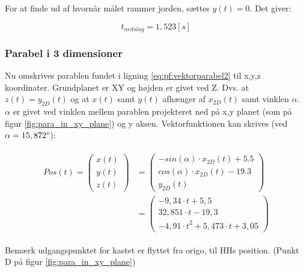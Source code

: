For at finde ud af hvornår målet rammer jorden, sættes \(y(t) = 0\). Det giver:

\begin{equation}
t_{nedslag} = 1,523 [s]
\label{eq:pf:nedslagstid}
\end{equation}

\subsubsection{Parabel i 3 dimensioner}
\label{subsubsec:para}
Nu omskrives parablen fundet i ligning \ref{eq:pf:vektorparabel2} til x,y,z koordinater. 
Grundplanet er XY og højden er givet ved Z. Dvs. at \(z(t) = y_{2D}(t)\) og at \(x(t)\) samt \(y(t)\) afhænger af \(x_{2D}(t)\) samt vinklen \(\alpha\). 
\(\alpha\) er givet ved vinklen mellem parablen projekteret ned på x,y planet (som på figur \ref{fig:para_in_xy_plane}) og y aksen. 
Vektorfunktionen kan skrives (ved \(\alpha = 15,872 \degree\)): 

\begin{align}
\begin{split}
Pos\left( t \right) = 
\left( \begin{matrix} x\left( t \right)  \\
 y\left( t \right)  \\ 
 z\left( t \right)  \end{matrix} \right) &=
 \left( \begin{matrix} - sin\left( \alpha  \right) \cdot { x }_{ 2D }\left( t \right) + 5.5 \\
 cos\left( \alpha  \right) \cdot { x }_{ 2D }\left( t \right) - 19.3  \\
  { y }_{ 2D }\left( t \right)  \end{matrix} \right)
\\
&= \left( \begin{matrix} - 9,34\cdot t+5,5 \\
  32,851\cdot t-19,3 \\ 
 -{ 4,91\cdot t }^{ 2 }+5,473\cdot t+3,05\end{matrix} \right) 
\label{eq:pf:vektorparabel3d}
\end{split}
\end{align}





Bemærk udgangspunktet for kastet er flyttet fra origo, til HHs position. (Punkt D på figur \ref{fig:para_in_xy_plane})
